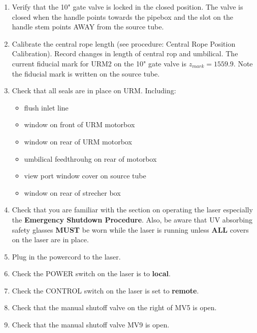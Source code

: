 \documentclass[11pt]{article}
\begin{document}
\begin{enumerate}
\item \CheckBox[name=rluo12]{} Verify that the 10" gate valve is locked in the closed position. The valve is closed when the handle points towards the pipebox and the slot on the handle stem points AWAY from the source tube.
\item \CheckBox[name=rluo13]{} Calibrate the central rope length (see procedure: Central Rope Position Calibration). Record changes in length of central rop and umbilical. The current fiducial mark for URM2 on the 10" gate valve is $z_{mark} = 1559.9$. Note the fiducial mark is written on the source tube. 
\item \CheckBox[name=rluo14]{} Check that all seals are in place on URM. Including:
	\begin{itemize}
	\item \CheckBox[name=urms1]{} flush inlet line
	\item \CheckBox[name=urms2]{} window on front of URM motorbox
	\item \CheckBox[name=urms3]{} window on rear of URM motorbox
	\item \CheckBox[name=urms4]{} umbilical feedthrouhg on rear of motorbox
	\item \CheckBox[name=urms5]{} view port window cover on source tube
	\item \CheckBox[name=urms6]{} window on rear of strecher box
	\end{itemize}
\item \CheckBox[name=rluo15]{} Check that you are familiar with the section on operating the laser especially the {\bf Emergency Shutdown Procedure}. Also, be aware that UV absorbing safety glasses {\bf MUST} be worn while the laser is running unless {\bf ALL} covers on the laser are in place.
\item \CheckBox[name=rluo16]{} Plug in the powercord to the laser.
\item \CheckBox[name=rluo17]{} Check the POWER switch on the laser is to {\bf local}.
\item \CheckBox[name=rluo18]{} Check the CONTROL switch on the laser is set to {\bf remote}.
\item \CheckBox[name=rluo19]{} Check that the manual shutoff valve on the right of MV5 is open.
\item \CheckBox[name=rluo20]{} Check that the manual shutoff valve MV9 is open.

\end{enumerate}
\end{document}
